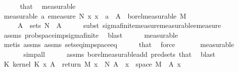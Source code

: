 \begin{isabellebody}
\ \ \ \ \isamarkupfalse%
\ that\ \isamarkupfalse%
\ measurable\isanewline
\ \ \isamarkupfalse%
\ \isamarkupfalse%
\ {\isacharasterisk}{\kern0pt}{\isacharbrackleft}{\kern0pt}measurable{\isacharbrackright}{\kern0pt}{\isacharcolon}{\kern0pt}\ {\isachardoublequoteopen}{\isacharparenleft}{\kern0pt}{\isasymlambda}a{\isachardot}{\kern0pt}\ emeasure\ N\ {\isacharbraceleft}{\kern0pt}x{\isachardot}{\kern0pt}\ x\ {\isacharplus}{\kern0pt}\ a\ {\isasymin}\ A{\isacharprime}{\kern0pt}{\isacharbraceright}{\kern0pt}{\isacharparenright}{\kern0pt}\ {\isasymin}\ borel{\isacharunderscore}{\kern0pt}measurable\ M{\isachardoublequoteclose}\isanewline
\ \ \ \ \ {\isachardoublequoteopen}A{\isacharprime}{\kern0pt}\ {\isasymin}\ sets\ N{\isachardoublequoteclose}\ \ A{\isacharprime}{\kern0pt}\isanewline
\ \ \ \ \isamarkupfalse%
\ {\isacharparenleft}{\kern0pt}subst\ sigma{\isacharunderscore}{\kern0pt}finite{\isacharunderscore}{\kern0pt}measure{\isachardot}{\kern0pt}measurable{\isacharunderscore}{\kern0pt}emeasure{\isacharparenright}{\kern0pt}\isanewline
\ \ \ \ \isamarkupfalse%
\ assms{\isacharparenleft}{\kern0pt}{}{\isacharparenright}{\kern0pt}\ prob{\isacharunderscore}{\kern0pt}space{\isacharunderscore}{\kern0pt}imp{\isacharunderscore}{\kern0pt}sigma{\isacharunderscore}{\kern0pt}finite\ \isamarkupfalse%
\ blast\isanewline
\ \ \ \ \isamarkupfalse%
\ measurable\isanewline
\ \ \ \ \ \ \ \isamarkupfalse%
\ {\isacharparenleft}{\kern0pt}metis\ assms{\isacharparenleft}{\kern0pt}{}{\isacharparenright}{\kern0pt}\ assms{\isacharparenleft}{\kern0pt}{}{\isacharparenright}{\kern0pt}\ sets{\isacharunderscore}{\kern0pt}eq{\isacharunderscore}{\kern0pt}imp{\isacharunderscore}{\kern0pt}space{\isacharunderscore}{\kern0pt}eq{\isacharparenright}{\kern0pt}\isanewline
\ \ \ \ \isamarkupfalse%
\ that\ \isamarkupfalse%
\ force\isanewline
\ \ \ \ \ \isamarkupfalse%
\ measurable\isanewline
\ \ \ \ \ \isamarkupfalse%
\ simp{\isacharunderscore}{\kern0pt}all\isanewline
\ \ \ \ \isamarkupfalse%
\ assms{\isacharparenleft}{\kern0pt}{}{\isacharparenright}{\kern0pt}\ borel{\isacharunderscore}{\kern0pt}measurable{\isacharunderscore}{\kern0pt}add\ pred{\isacharunderscore}{\kern0pt}sets{}\ that\ \isamarkupfalse%
\ blast\isanewline
\ \ \isamarkupfalse%
\ K{}{\isacharcolon}{\kern0pt}\ {\isachardoublequoteopen}kernel\ K\ x\ A{\isacharprime}{\kern0pt}\ {\isacharequal}{\kern0pt}\ {\isacharparenleft}{\kern0pt}{\isacharparenleft}{\kern0pt}return\ M\ x{\isacharparenright}{\kern0pt}\ {\isasymstar}\ N{\isacharparenright}{\kern0pt}\ A{\isacharprime}{\kern0pt}{\isachardoublequoteclose}\ \ {\isachardoublequoteopen}x\ {\isasymin}\ space\ M{\isachardoublequoteclose}\ \ A{\isacharprime}{\kern0pt}\ x\isanewline

\end{isabellebody}
